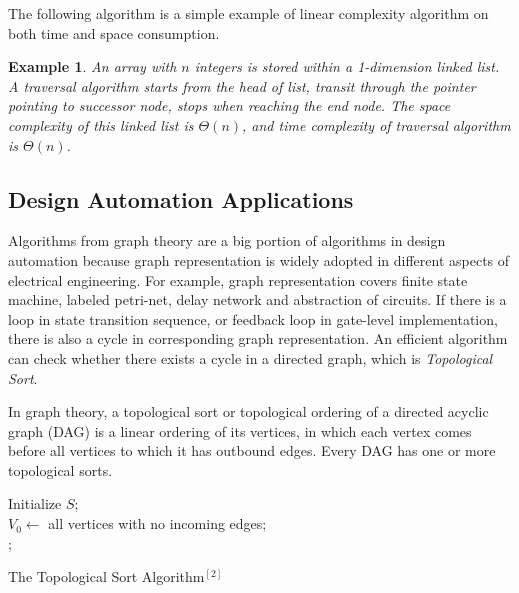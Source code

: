 \documentclass[11pt,twoside, onecolumn]{IEEEtran}
\newtheorem{Example}{Example}[section]
\begin{document}
The following algorithm is a simple example of linear complexity algorithm on both time
and space consumption.
\begin{Example}
An array with $n$ integers is stored within a 1-dimension linked list. A traversal algorithm
starts from the head of list, transit through the pointer pointing to successor node, stops
when reaching the end node. The space complexity of this linked list is $\Theta(n)$, and
time complexity of traversal algorithm is $\Theta(n)$.
\end{Example}

\subsection{Design Automation Applications}
\label{sec:graph}
Algorithms from graph theory are a big portion of algorithms in design automation because
graph representation is widely adopted in different aspects of electrical engineering. For example,
graph representation covers finite state machine, labeled petri-net, delay network and abstraction
of circuits. If there is a loop in state transition sequence, or feedback loop in gate-level
implementation, there is also a cycle in corresponding graph representation. An efficient
algorithm can check whether there exists a cycle in a directed graph, which is
\emph{Topological Sort}.

In graph theory, a topological sort or topological ordering of a directed acyclic graph (DAG) is a linear
 ordering of its vertices, in which each vertex comes before all vertices to which it has outbound edges. 
 Every DAG has one or more topological sorts.

\begin{algorithm}[hbt]
\SetAlgoNoLine
  Initialize $S$;\\
  $V_0 \gets$ all vertices with no incoming edges;\\
   {
   		;\\
   		}
\caption{The Topological Sort Algorithm$^{[2]}$}\label{alg:top}
\end{algorithm}
\end{document}
